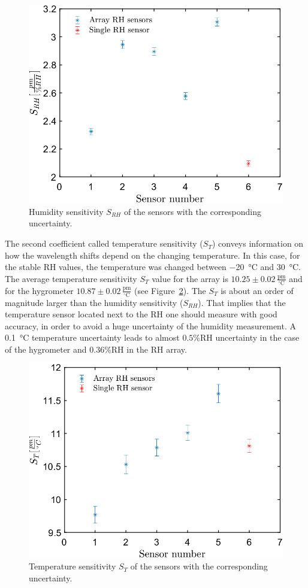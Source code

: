 \begin{figure}[!h]
\centering
\includegraphics[width=0.57\columnwidth]{Chapter5/images/comp1.png}
\caption{Humidity sensitivity $S_{RH}$ of the sensors with the corresponding uncertainty.}
\label{fig_calibration}
\end{figure}

The second coefficient called temperature sensitivity ($S_{T}$) conveys information on how the wavelength shifts depend on the changing temperature. In this case, for the stable \gls{RH} values, the temperature was changed between \SI{-20}{\celsius} and \SI{30}{\celsius}. The average temperature sensitivity $S_{T}$ value for the array is $10.25\pm0.02\,\mathrm{\frac{pm}{^{\circ}C}}$ and for the hygrometer $10.87\pm 0.02\,\mathrm{\frac{pm}{^{\circ}C}}$ (see Figure~\ref{fig_calibration1}). The $S_{T}$ is about an order of magnitude larger than the humidity sensitivity ($S_{RH}$). That implies that the temperature sensor located next to the \gls{RH} one should measure with good accuracy, in order to avoid a huge uncertainty of the humidity measurement. A \SI{0.1}{\celsius} temperature uncertainty leads to almost $0.5$\%RH uncertainty in the case of the hygrometer and $0.36$\%RH in the \gls{RH} array. 

\begin{figure}[!h]
\centering
\includegraphics[width=0.57\columnwidth]{Chapter5/images/comp.png}
\caption{Temperature sensitivity $S_{T}$ of the sensors with the corresponding uncertainty.}
\label{fig_calibration1}
\end{figure}
\newpage
